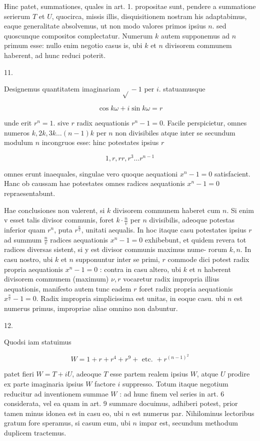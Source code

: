 \documentclass[10pt]{article}
\begin{document}
Hinc patet, summationes, quales in art. 1. propositae sunt, pendere a summatione serierum \(T\) et \(U\), quocirca, missis illis, disquisitionem nostram his adaptabimus, eaque generalitate absolvemus, ut non modo valores primos ipsius \(n\). sed quoscunque compositos complectatur. Numerum \(k\) autem supponemus ad \(n\) primum esse: nullo enim negotio casus is, ubi \(k\) et \(n\) divisorem communem haberent, ad hunc reduci poterit.

11.

Designemus quantitatem imaginariam \(\sqrt{ }-1\) per \(i\). statuamusque

\[
\cos k \omega+i \sin k \omega=r
\]

unde erit \(r^{n}=1\). sive \(r\) radix aequationis \(r^{n}-1=0\). Facile perspicietur, omnes numeros \(k, 2 k, 3 k \ldots(n-1) k\) per \(n\) non divisibiles atque inter se secundum modulum \(n\) incongruos esse: hinc potestates ipsius \(r\)

\[
1, r, r r, r^{3} \ldots r^{n-1}
\]

omnes erunt inaequales, singulae vero quoque aequationi \(x^{n}-1=0\) satisfacient. Hanc ob caussam hae potestates omnes radices aequationis \(x^{n}-1=0\) repraesentabunt.

Hae conclusiones non valerent, si \(k\) divisorem communem haberet cum \(n\). Si enim v esset talis divisor communis, foret \(k \cdot \frac{n}{v}\) per \(n\) divisibilis, adeoque potestas inferior quam \(r^{n}\), puta \(r^{\frac{n}{v}}\), unitati aequalis. In hoc itaque casu potestates ipsius \(r\) ad summum \(\frac{n}{v}\) radices aequationis \(x^{n}-1=0\) exhibebunt, et quidem revera tot radices diversas sistent, si y est divisor communis maximus nume-
rorum \(k, n\). In casu nostro, ubi \(k\) et \(n\) supponuntur inter se primi, \(r\) commode dici potest radix propria aequationis \(x^{n}-1=0\) : contra in casu altero, ubi \(k\) et \(n\) haberent divisorem communem (maximum) \(\nu, r\) vocaretur radix impropria illius aequationis, manifesto autem tunc eadem \(r\) foret radix propria aequationis \(x^{\frac{n}{v}}-1=0\). Radix impropria simplicissima est unitas, in eoque casu. ubi \(n\) est numerus primus, impropriae aliae omnino non dabuntur.

12.

Quodsi iam statuimus

\[
W=1+r+r^{4}+r^{9}+\text { etc. }+r^{(n-1)^{2}}
\]

patet fieri \(W=T+i U\), adeoque \(T\) esse partem realem ipsius \(W\), atque \(U\) prodire ex parte imaginaria ipsius \(W\) factore \(i\) suppresso. Totum itaque negotium reducitur ad inventionem summae \(W\) : ad hunc finem vel series in art. 6 considerata, vel ea quam in art. 9 summare docuimus, adhiberi potest, prior tamen minus idonea est in casu eo, ubi \(n\) est numerus par. Nihilominus lectoribus gratum fore speramus, si casum eum, ubi \(n\) impar est, secundum methodum duplicem tractemus.
\end{document}

